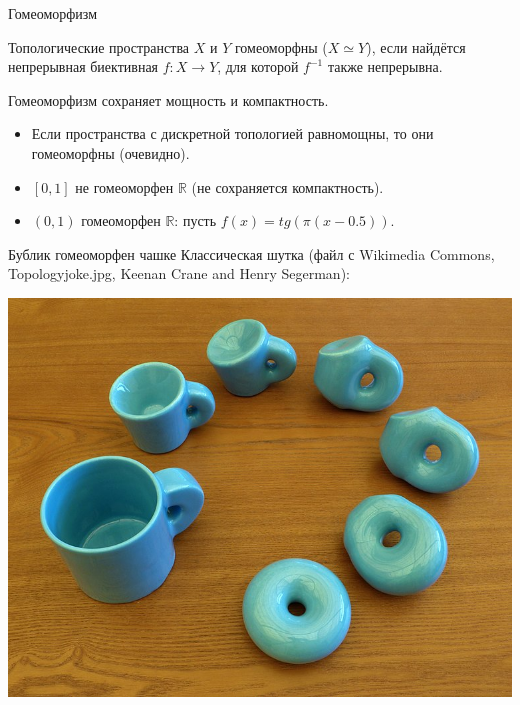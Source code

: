 \documentclass[aspectratio=169,dvipsnames,usenames]{beamer}
\begin{document}
\begin{frame}{Гомеоморфизм}
\begin{dfn}
Топологические пространства $X$ и $Y$ гомеоморфны ($X \simeq Y$), если найдётся непрерывная биективная $f : X \rightarrow Y$, для которой $f^{-1}$ также непрерывна.
\end{dfn}

\begin{thm}
Гомеоморфизм сохраняет мощность и компактность.
\end{thm}

\begin{exm}
\begin{itemize}
\item Если пространства с дискретной топологией равномощны, то они гомеоморфны (очевидно).
\item $[0,1]$ не гомеоморфен $\mathbb{R}$ (не сохраняется компактность).
\item $(0,1)$ гомеоморфен $\mathbb{R}$: пусть $f(x) = tg(\pi (x - 0.5))$.
\end{itemize}
\end{exm}

\end{frame}

\begin{frame}{Бублик гомеоморфен чашке}
Классическая шутка (файл с Wikimedia Commons, Topology\textunderscore{}joke.jpg, Keenan Crane and Henry Segerman):

\begin{center}
    {\includegraphics[scale=0.2]{Topology_joke.jpg}}
\end{center}

\end{frame}
\end{document}
